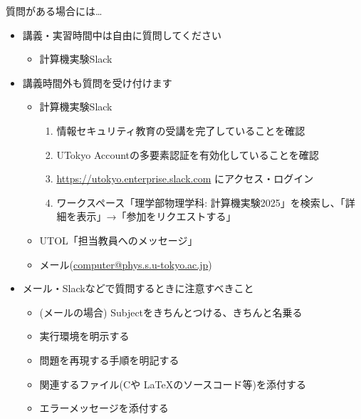 \begin{frame}[t]{質問がある場合には…}
  \begin{itemize}
  \item 講義・実習時間中は自由に質問してください
    \begin{itemize}
    \item 計算機実験Slack
    \end{itemize}
  \item 講義時間外も質問を受け付けます
    \begin{itemize}
    \item 計算機実験Slack
      \begin{enumerate}
        \item 情報セキュリティ教育の受講を完了していることを確認
        \item UTokyo Accountの多要素認証を有効化していることを確認
        \item \href{https://utokyo.enterprise.slack.com/}{https://utokyo.enterprise.slack.com} にアクセス・ログイン
        \item ワークスペース「理学部物理学科: 計算機実験2025」を検索し、「詳細を表示」→「参加をリクエストする」
      \end{enumerate}
    \item UTOL「担当教員へのメッセージ」
    \item メール(\href{mailto:computer@phys.s.u-tokyo.ac.jp}{computer@phys.s.u-tokyo.ac.jp})
    \end{itemize}
  \item メール・Slackなどで質問するときに注意すべきこと
    \begin{itemize}
    \item (メールの場合) Subjectをきちんとつける、きちんと名乗る
    \item 実行環境を明示する
    \item 問題を再現する手順を明記する
    \item 関連するファイル(Cや \LaTeX のソースコード等)を添付する
    \item エラーメッセージを添付する
    \end{itemize}
  \end{itemize}
\end{frame}

